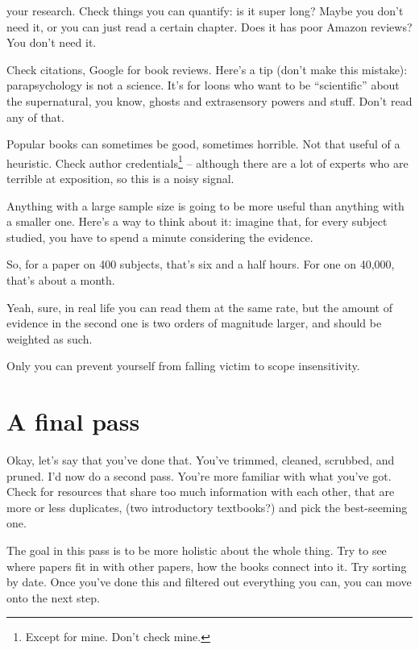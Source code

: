  your research. Check things you can quantify: is it
super long? Maybe you don't need it, or you can just read a certain
chapter. Does it has poor Amazon reviews? You don't need it.

Check citations, Google for book reviews. Here's a tip (don't make this mistake):
parapsychology is not a science. It's for loons who want to be ``scientific'' about the supernatural, you know, ghosts and extrasensory powers and
stuff. Don't read any of that.

Popular books can sometimes be good, sometimes horrible. Not that useful of a heuristic. Check author credentials\footnote{Except for mine. Don't check mine.} -- although there are a lot of experts who
are terrible at exposition, so this is a noisy signal. 

 Anything with a large sample size is going to be more useful
than anything with a smaller one. Here's a way to think about it: imagine that,
for every subject studied, you have to spend a minute considering the evidence.

So, for a paper on 400 subjects, that's six and a half hours. For one on 40,000,
that's about a month.

Yeah, sure, in real life you can read them at the same rate, but the amount of
evidence in the second one is two orders of magnitude larger, and should be
weighted as such.

Only you can prevent yourself from falling victim to scope insensitivity.


\section{A final pass}

Okay, let's say that you've done that. You've trimmed, cleaned, scrubbed, and pruned. I'd now do
a second pass. You're more familiar with what you've got. Check for resources that
share too much information with each other, that are more or less duplicates,
(two introductory textbooks?) and pick the best-seeming one.

The goal in this pass is to be more holistic about the whole thing. Try to see
where papers fit in with other papers, how the books connect into it. Try sorting by
date. Once you've done this and filtered out everything you can, you can move
onto the next step.

